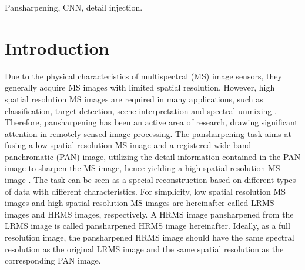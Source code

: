 \documentclass[journal]{IEEEtran}
\begin{document}
\begin{IEEEkeywords}
Pansharpening, CNN, detail injection.
\end{IEEEkeywords}


\IEEEpeerreviewmaketitle



\section{Introduction}

Due to the physical characteristics of multispectral (MS) image sensors, they generally acquire MS images with limited spatial resolution. However, high spatial resolution MS images are required in many applications, such as classification, target detection, scene interpretation and spectral unmixing \cite{Survey:Vivone2015,Survey:Alparone2007}. Therefore, pansharpening has been an active area of research, drawing significant attention in remotely sensed image processing. The pansharpening task aims at fusing a low spatial resolution MS image and a registered wide-band panchromatic (PAN) image, utilizing the detail information contained in the PAN image to sharpen the MS image, hence yielding a high spatial resolution MS image \cite{Survey:Vivone2015}. The task can be seen as a special reconstruction based on different types of data with different characteristics. For simplicity, low spatial resolution MS images and high spatial resolution MS images are hereinafter called LRMS images and HRMS images, respectively. A HRMS image pansharpened from the LRMS image is called pansharpened HRMS image hereinafter. Ideally, as a full resolution image, the pansharpened HRMS image should have the same spectral resolution as the original LRMS image and the same spatial resolution as the corresponding PAN image.
\end{document}
